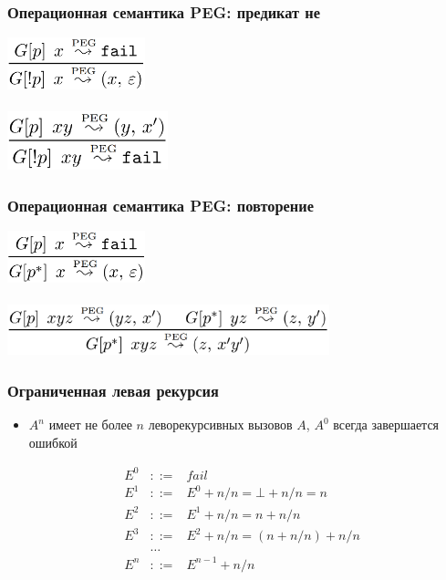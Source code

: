 \documentclass{beamer}
\begin{document}
\begin{frame}[fragile]
  \transwipe[direction=90]
  \frametitle{Операционная семантика PEG: предикат не}
\begin{center}
  \includegraphics[width=0.3\textwidth]{pics/not1}  \\~\\     \pause
  \includegraphics[width=0.35\textwidth]{pics/not2} 
\end{center}
\end{frame}

\begin{frame}[fragile]
  \transwipe[direction=90]
  \frametitle{Операционная семантика PEG: повторение}
\begin{center}
  \includegraphics[width=0.3\textwidth]{pics/rep1}  \\~\\     \pause
  \includegraphics[width=0.7\textwidth]{pics/rep2} 
\end{center}
\end{frame}

\begin{frame}[fragile]
  \transwipe[direction=90]
  \frametitle{Ограниченная левая рекурсия}
\begin{itemize}
  \item $A^n$ имеет не более $n$ леворекурсивных вызовов $A$, $A^0$ всегда 
завершается ошибкой
\end{itemize}
$$
\begin{array}{crcl}
&E^0 & ::= & fail \\ 
&E^1 & ::= & E^0 + n / n = \bot + n / n = n \\
&E^2 & ::= & E^1 + n / n = n + n / n \\
&E^3 & ::= & E^2 + n / n = (n + n / n) + n / n\\
& & \dots &  \\
&E^n & ::= & E^{n-1} + n / n \\
\end{array}
$$ 
\end{frame}
\end{document}
